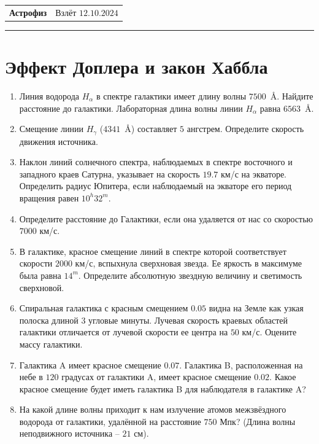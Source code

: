 \documentclass[12pt]{article}
\begin{document}
\begin{tabularx}{\textwidth}{Xr}
{\Large \textbf{Астрофиз}} & Взлёт $12.10.2024$ \\
\end{tabularx}
\noindent\rule{\textwidth}{0.4pt}
\section*{Эффект Доплера и закон Хаббла}
\begin{enumerate}
    \item Линия водорода $H_{\alpha}$  в спектре галактики имеет длину волны $7500$~\AA. Найдите расстояние до галактики. Лабораторная длина волны линии $H_{\alpha}$ равна $6563$~\AA.
    \item Смещение линии $H_{\gamma}$ ($4341$~\AA) составляет $5$ ангстрем. Определите скорость движения источника.
    \item Наклон линий солнечного спектра, наблюдаемых в спектре восточного и западного краев Сатурна, указывает на скорость $19.7$ км/с на экваторе. Определить радиус Юпитера, если наблюдаемый на экваторе его период вращения равен $10^h32^m$.
    \item Определите расстояние до Галактики, если она удаляется от нас со скоростью $7000$ км/с.
    \item В галактике, красное смещение линий в спектре которой соответствует скорости $2000$ км/с, вспыхнула сверхновая звезда. Ее яркость в максимуме была равна $14^m$. Определите абсолютную звездную величину и светимость сверхновой.
    \item Спиральная галактика с красным смещением $0.05$ видна на Земле как узкая полоска длиной $3$ угловые минуты. Лучевая скорость краевых областей галактики отличается от лучевой скорости ее центра на $50$ км/с. Оцените массу галактики.
    \item Галактика A имеет красное смещение $0.07$. Галактика B, расположенная на небе в $120$ градусах от галактики A, имеет красное смещение $0.02$. Какое красное смещение будет иметь галактика B для наблюдателя в галактике A? 
    \item На какой длине волны приходит к нам излучение атомов межзвёздного водорода от галактики, удалённой на расстояние $750$ Мпк? (Длина волны неподвижного источника -- $21$ см).
\end{enumerate}
\end{document}
